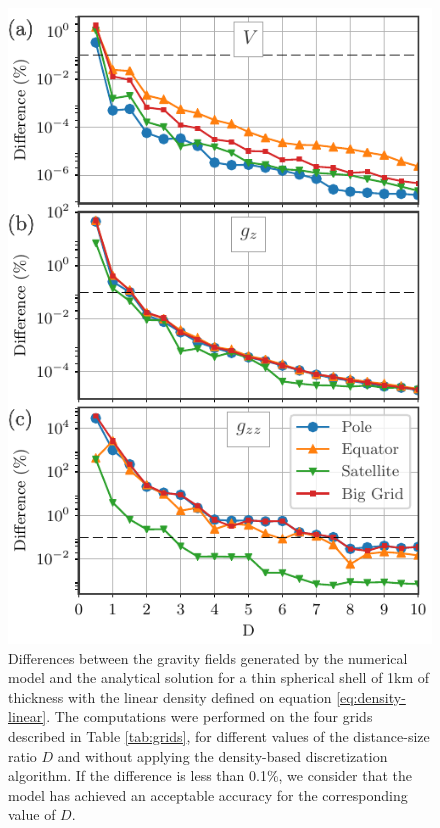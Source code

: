 \documentclass[extra]{gji}
\begin{document}
\begin{figure}
\centering
\includegraphics[width=0.9\linewidth]{figures/linear-D-thin.pdf}
\caption{
    Differences between the gravity fields generated by the numerical model and the analytical solution for a thin spherical shell of 1km of thickness with the linear density defined on equation \ref{eq:density-linear}. The computations were performed on the four grids described in Table \ref{tab:grids}, for different values of the distance-size ratio $D$ and without applying the density-based discretization algorithm. If the difference is less than 0.1\%, we consider that the model has achieved an acceptable accuracy for the corresponding value of $D$.
}
\label{fig:D-linear-thin}
\end{figure}
\end{document}
